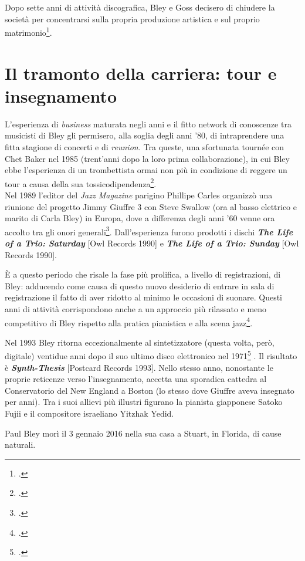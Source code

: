 Dopo sette anni di attività discografica, Bley e Goss decisero di chiudere la società per concentrarsi sulla propria produzione artistica e sul proprio matrimonio\footcite[132]{stopping}.\par
\section{Il tramonto della carriera: tour e insegnamento}
L'esperienza di \textit{business} maturata negli anni e il fitto network di conoscenze tra musicisti di Bley gli permisero, alla soglia degli anni '80, di intraprendere una fitta stagione di concerti e di \textit{reunion.} Tra queste, una sfortunata tournée con Chet Baker nel 1985 (trent'anni dopo la loro prima collaborazione), in cui Bley ebbe l'esperienza di un trombettista ormai non più in condizione di reggere un tour a causa della sua tossicodipendenza\footcite[137]{stopping}. \\
Nel 1989 l'editor del \textit{Jazz Magazine} parigino Phillipe Carles organizzò una riunione del progetto Jimmy Giuffre 3 con Steve Swallow (ora al basso elettrico e marito di Carla Bley) in Europa, dove a differenza degli anni '60 venne ora accolto tra gli onori generali\footcite[137]{stopping}. Dall'esperienza furono prodotti i dischi \textit{\textbf{The Life of a Trio: Saturday}} [Owl Records 1990] e \textit{\textbf{The Life of a Trio: Sunday}} [Owl Records 1990]. \par
È a questo periodo che risale la fase più prolifica, a livello di registrazioni, di Bley: adducendo come causa di questo nuovo desiderio di entrare in sala di registrazione il fatto di aver ridotto al minimo le occasioni di suonare. Questi anni di attività corrispondono anche a un approccio più rilassato e meno competitivo di Bley rispetto alla pratica pianistica e alla scena jazz\footcite[82]{cappelletti}.\par
Nel 1993 Bley ritorna eccezionalmente al sintetizzatore (questa volta, però, digitale) ventidue anni dopo il suo ultimo disco elettronico nel 1971\footcite[148]{stopping}
. Il risultato è \textit{\textbf{Synth-Thesis}} [Postcard Records 1993]. Nello stesso anno, nonostante le proprie reticenze verso l'insegnamento, accetta una sporadica cattedra al Conservatorio del New England a Boston (lo stesso dove Giuffre aveva insegnato per anni). Tra i suoi allievi più illustri figurano la pianista giapponese Satoko Fujii e il compositore israeliano Yitzhak Yedid.\par
Paul Bley morì il 3 gennaio 2016 nella sua casa a Stuart, in Florida, di cause naturali.
